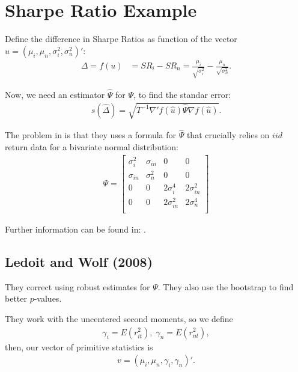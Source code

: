\documentclass[12pt,oneside,a4paper]{article}
\begin{document}
\clearpage
\section{Sharpe Ratio Example}

Define the difference in Sharpe Ratios as function of the vector $u = (\mu_{i}, \mu_{n}, \sigma^2_{i}, \sigma^2_{n})'$:
\begin{align}
\Delta = f(u) &= SR_{i} - SR_{n} 
= \frac{\mu_{i}}{\sqrt{\sigma^2_{i}}} - \frac{\mu_{n}}{\sqrt{\sigma^2_{n}}}.
\end{align}

Now, we need an estimator $\hat{\Psi}$ for $\Psi$, to find the standar error:
\begin{align}
s(\hat{\Delta}) = \sqrt{T^{-1} \nabla'f(\hat{u}) \hat{\Psi} \nabla f(\hat{u})}.
\end{align}

The problem in \cite{jb81-sr} is that they uses a formula for $\hat{\Psi}$ that crucially relies on $iid$ return data for a bivariate normal distribution:
\begin{align*}
\Psi = 
\begin{bmatrix}
\sigma^2_{i} & \sigma_{in} & 0 & 0 \\
\sigma_{in} & \sigma^2_{n} & 0 & 0 \\
0 & 0 & 2\sigma^{4}_{i} & 2\sigma^{2}_{in}  \\
0 & 0 & 2\sigma^{2}_{in} & 2\sigma^{4}_{n}  \\
\end{bmatrix}
\end{align*}

Further information can be found in: \cite{lo02-sr, jb81-sr}.

\subsection{Ledoit and Wolf (2008)}

They correct \cite{jb81-sr} using robust estimates for $\Psi$.
They also use the bootstrap to find better $p$-values.

They work with the uncentered second moments, so we define 
\begin{align*}
	\gamma_{i} = E(r_{it}^{2}), \; \gamma_{n} = E(r_{nt}^{2}),
\end{align*}
then, our vector of primitive statistics is
\begin{align*}
v = (\mu_{i}, \mu_{n}, \gamma_{i}, \gamma_{n})'.
\end{align*}
\end{document}

